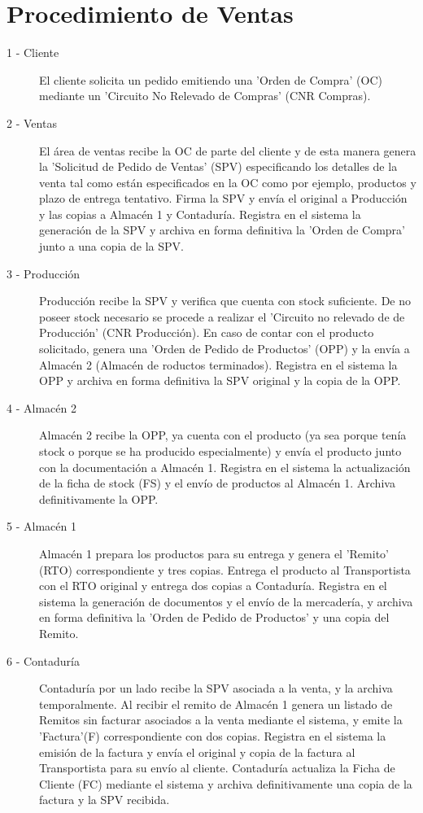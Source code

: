 \section{Procedimiento de Ventas}
 \begin{description}
	\item[1 - Cliente] El cliente solicita un pedido emitiendo una 'Orden de Compra' (OC) mediante un 'Circuito No Relevado de Compras' (CNR Compras).
	\item[2 - Ventas] El \'area de ventas recibe la OC de parte del cliente y de esta manera genera la 'Solicitud de Pedido de Ventas' (SPV) especificando los detalles de la venta tal como est\'an especificados en la OC como por ejemplo, productos y plazo de entrega tentativo. Firma la SPV y env\'ia el original a Producci\'on y las copias a Almac\'en 1 y Contadur\'ia. Registra en el sistema la generaci\'on de la SPV y archiva en forma definitiva la 'Orden de Compra' junto a una copia de la SPV.
	\item[3 - Producci\'on] Producci\'on recibe la SPV y verifica que cuenta con stock suficiente. De no poseer stock necesario se procede a realizar el 'Circuito no relevado de de Producci\'on' (CNR Producci\'on). En caso de contar con el producto solicitado, genera una 'Orden de Pedido de Productos' (OPP) y la env\'ia a Almac\'en 2 (Almac\'en de roductos terminados).  Registra en el sistema la OPP y archiva en forma definitiva la SPV original y la copia de la OPP. 
	\item[4 - Almac\'en 2] Almac\'en 2 recibe la OPP, ya cuenta con el producto (ya sea porque ten\'ia stock o porque se ha producido especialmente) y env\'ia el producto junto con la documentaci\'on a Almac\'en 1. Registra en el sistema la actualización de la ficha de stock (FS) y el envío de productos al Almac\'en 1. Archiva definitivamente la OPP.
	\item[5 - Almac\'en 1] Almac\'en 1 prepara los productos para su entrega y genera el 'Remito' (RTO) correspondiente y tres copias. Entrega el producto al Transportista con el RTO original y entrega dos copias a Contadur\'ia. Registra en el sistema la generación de documentos y el env\'io de la mercader\'ia, y archiva en forma definitiva la 'Orden de Pedido de Productos' y una copia del Remito.
	\item[6 - Contadur\'ia] Contadur\'ia por un lado recibe la SPV asociada a la venta, y la archiva temporalmente. Al recibir el remito de Almac\'en 1 genera un listado de Remitos sin facturar asociados a la venta mediante el sistema, y emite la 'Factura'(F) correspondiente con dos copias. Registra en el sistema la emisi\'on de la factura y env\'ia el original y copia de la factura al Transportista para su env\'io al cliente. Contadur\'ia actualiza la Ficha de Cliente (FC) mediante el sistema y archiva definitivamente una copia de la factura y la SPV recibida.

\end{description}
